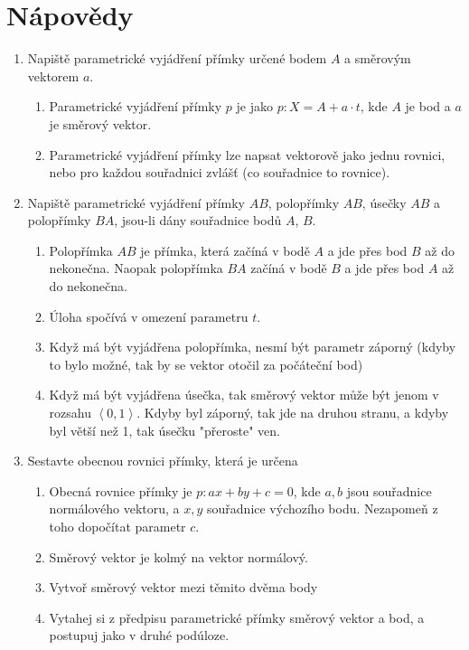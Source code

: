 \documentclass[]{article}
\begin{document}
	\pagebreak
	\section{Nápovědy}
	
	\begin{enumerate}
		\item Napiště parametrické vyjádření přímky určené bodem $A$ a směrovým vektorem $a$.
		\begin{enumerate}
			\item Parametrické vyjádření přímky $p$ je jako $p: X = A + a\cdot t$, kde $A$ je bod a $a$ je směrový vektor.
			\item Parametrické vyjádření přímky lze napsat vektorově jako jednu rovnici, nebo pro každou souřadnici zvlášť (co souřadnice to rovnice).
		\end{enumerate}
		\item Napiště parametrické vyjádření přímky $AB$, polopřímky $AB$, úsečky $AB$ a polopřímky $BA$, jsou-li dány souřadnice bodů $A$, $B$.
		\begin{enumerate}
			\item Polopřímka $AB$ je přímka, která začíná v bodě $A$ a jde přes bod $B$ až do nekonečna. Naopak polopřímka $BA$ začíná v bodě $B$ a jde přes bod $A$ až do nekonečna.
			\item Úloha spočívá v omezení parametru $t$.
			\item Když má být vyjádřena polopřímka, nesmí být parametr záporný (kdyby to bylo možné, tak by se vektor otočil za počáteční bod)
			\item Když má být vyjádřena úsečka, tak směrový vektor může být jenom v rozsahu $\left<0, 1\right>$. Kdyby byl záporný, tak jde na druhou stranu, a kdyby byl větší než 1, tak úsečku "přeroste" ven.
		\end{enumerate} 
		\item Sestavte obecnou rovnici přímky, která je určena
		\begin{enumerate}
			\item Obecná rovnice přímky je $p: ax + by + c = 0$, kde $a, b$ jsou souřadnice normálového vektoru, a $x, y$ souřadnice výchozího bodu. Nezapomeň z toho dopočítat parametr $c$.
			\item Směrový vektor je kolmý na vektor normálový.
			\item Vytvoř směrový vektor mezi těmito dvěma body
			\item Vytahej si z předpisu parametrické přímky směrový vektor a bod, a postupuj jako v druhé podúloze.
		\end{enumerate}
		

\end{enumerate}
\end{document}
